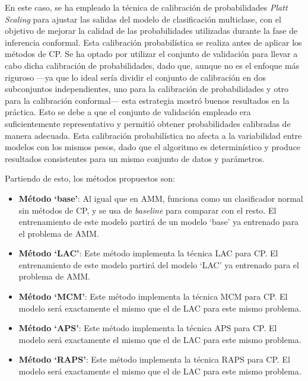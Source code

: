 En este caso, se ha empleado la técnica de calibración de probabilidades \textit{Platt Scaling} para ajustar 
las salidas del modelo de clasificación multiclase, con el objetivo de mejorar la calidad de las 
probabilidades utilizadas durante la fase de inferencia conformal. Esta calibración probabilística se 
realiza antes de aplicar los métodos de CP.
Se ha optado por utilizar el conjunto de validación para llevar a cabo dicha calibración de probabilidades, 
dado que, aunque no es el enfoque más riguroso ---ya que lo ideal sería dividir el conjunto de calibración en 
dos subconjuntos independientes, uno para la calibración de probabilidades y otro para la calibración 
conformal--- esta estrategia mostró buenos resultados en la práctica. Esto se debe a que el conjunto de 
validación empleado era suficientemente representativo y permitió obtener probabilidades calibradas de manera 
adecuada. Esta calibración probabilística no afecta a la variabilidad entre modelos con los mismos pesos, 
dado que el algoritmo es determinístico y produce resultados consistentes para un mismo conjunto de datos y 
parámetros. 

Partiendo de esto, los métodos propuestos son:

\begin{itemize}

\item \textbf{Método `base'}: Al igual que en AMM, funciona como un clasificador normal sin métodos de CP, y
se usa de \textit{baseline} para comparar con el resto.
El entrenamiento de este modelo partirá de un modelo `base' ya entrenado para el problema de AMM.

\item \textbf{Método `LAC'}: Este método implementa la técnica LAC para CP. 
El entrenamiento de este modelo partirá del modelo `LAC' ya entrenado para el problema de AMM.

\item \textbf{Método `MCM'}: Este método implementa la técnica MCM para CP. 
El modelo será exactamente el mismo que el de LAC para este mismo problema. 

\item \textbf{Método `APS'}: Este método implementa la técnica APS para CP. 
El modelo será exactamente el mismo que el de LAC para este mismo problema.

\item \textbf{Método `RAPS'}: Este método implementa la técnica RAPS para CP. 
El modelo será exactamente el mismo que el de LAC para este mismo problema. 

\end{itemize} 


